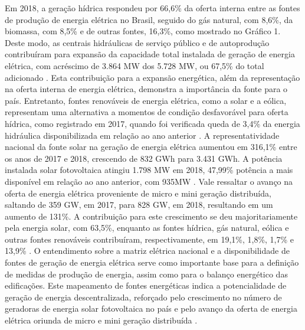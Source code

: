\begin{onehalfspace}
\noindent Em 2018, a geração hídrica respondeu por 66,6\% da oferta interna entre as fontes de produção de energia elétrica no Brasil, seguido do gás natural, com 8,6\%, da biomassa, com 8,5\% e de outras fontes, 16,3\%, como mostrado no Gráfico 1. Deste modo, as centrais hidráulicas de serviço público e de autoprodução contribuíram para expansão da capacidade total instalada de geração de energia elétrica, com acréscimo de 3.864 MW dos 5.728 MW, ou 67,5\% do total adicionado \cite{EmpresadePesquisaEnergetica-EPE2019}.\vspace*{0.3cm} \newline
\noindent Esta contribuição para a expansão energética, além da representação na oferta interna de energia elétrica, demonstra a importância da fonte para o país. Entretanto, fontes renováveis de energia elétrica, como a solar e a eólica, representam uma alternativa a momentos de condição desfavorável para oferta hídrica, como registrado em 2017, quando foi verificada queda de 3,4\% da energia hidráulica disponibilizada em relação ao ano anterior \cite{EmpresadePesquisaEnergetica-EPE2018}.\vspace*{0.3cm} \newline
A representatividade nacional da fonte solar na geração de energia elétrica aumentou em 316,1\% entre os anos de 2017 e 2018, crescendo de 832 GWh para 3.431 GWh. A potência instalada solar fotovoltaica atingiu 1.798 MW em 2018, 47,99\% potência a mais disponível em relação ao ano anterior, com 935MW \cite{EmpresadePesquisaEnergetica-EPE2019,EmpresadePesquisaEnergetica-EPE2019a}.\vspace{0.3cm} \newline
Vale ressaltar o avanço na oferta de energia elétrica proveniente de micro e mini geração distribuída, saltando de 359 GW, em 2017, para 828 GW, em 2018, resultando em um aumento de 131\%. A contribuição para este crescimento se deu majoritariamente pela energia solar, com 63,5\%, enquanto as fontes hídrica, gás natural, eólica e outras fontes renováveis contribuíram, respectivamente, em 19,1\%, 1,8\%, 1,7\% e 13,9\% \cite{EmpresadePesquisaEnergetica-EPE2019}.\vspace{0.3cm} \newline
O entendimento sobre a matriz elétrica nacional e a disponibilidade de fontes de geração de energia elétrica serve como importante base para a definição de medidas de produção de energia, assim como para o balanço energético das edificações. Este mapeamento de fontes energéticas indica a potencialidade de geração de energia descentralizada, reforçado pelo crescimento no número de geradoras de energia solar fotovoltaica no país e pelo avanço da oferta de energia elétrica oriunda de micro e mini geração distribuída \cite{EmpresadePesquisaEnergetica-EPE2019,EmpresadePesquisaEnergetica-EPE2019a,Pereira2017}.\vspace{0.3cm} \newline

\end{onehalfspace}
